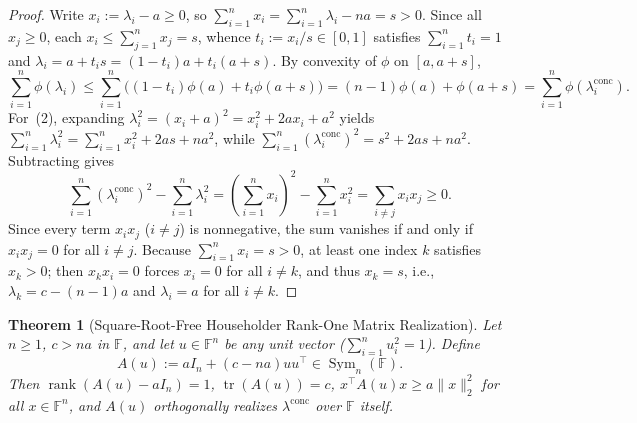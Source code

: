 \documentclass[11pt]{article}
\newtheorem{theorem}{Theorem}[section]
\theoremstyle{definition}
\theoremstyle{remark}
\newcommand{\tr}{\operatorname{tr}}
\newcommand{\rk}{\operatorname{rank}}
\newcommand{\Sym}{\operatorname{Sym}}
\begin{document}
\begin{proof}
Write $x_i := \lambda_i - a \ge 0$, so $\sum_{i=1}^n x_i = \sum_{i=1}^n \lambda_i - n a = s > 0$. Since all $x_j \ge 0$, each $x_i \le \sum_{j=1}^n x_j = s$, whence $t_i := x_i / s \in [0,1]$ satisfies $\sum_{i=1}^n t_i = 1$ and $\lambda_i = a + t_i s = (1 - t_i)a + t_i(a + s)$. By convexity of $\phi$ on $[a, a + s]$,
\[
  \sum_{i=1}^n \phi(\lambda_i)
  \le \sum_{i=1}^n \bigl((1 - t_i)\phi(a) + t_i \phi(a + s)\bigr)
  = (n - 1)\phi(a) + \phi(a + s)
  = \sum_{i=1}^n \phi(\lambda_i^{\mathrm{conc}}).
\]
For~(2), expanding $\lambda_i^2 = (x_i + a)^2 = x_i^2 + 2 a x_i + a^2$ yields $\sum_{i=1}^n \lambda_i^2 = \sum_{i=1}^n x_i^2 + 2 a s + n a^2$, while $\sum_{i=1}^n (\lambda_i^{\mathrm{conc}})^2 = s^2 + 2 a s + n a^2$. Subtracting gives
\[
  \sum_{i=1}^n (\lambda_i^{\mathrm{conc}})^2 - \sum_{i=1}^n \lambda_i^2
  = \left(\sum_{i=1}^n x_i\right)^2 - \sum_{i=1}^n x_i^2
  = \sum_{i \neq j} x_i x_j \ge 0.
\]
Since every term $x_i x_j$ ($i \neq j$) is nonnegative, the sum vanishes if and only if $x_i x_j = 0$ for all $i \neq j$. Because $\sum_{i=1}^n x_i = s > 0$, at least one index $k$ satisfies $x_k > 0$; then $x_k x_i = 0$ forces $x_i = 0$ for all $i \neq k$, and thus $x_k = s$, i.e., $\lambda_k = c - (n-1)a$ and $\lambda_i = a$ for all $i \neq k$.
\end{proof}

\begin{theorem}[Square-Root-Free Householder Rank-One Matrix Realization]
\label{thm:householder}
Let $n \ge 1$, $c > n a$ in $\mathbb{F}$, and let $u \in \mathbb{F}^n$ be any unit vector ($\sum_{i=1}^n u_i^2 = 1$). Define
\[
  A(u) := a I_n + (c - n a) u u^\top \in \Sym_n(\mathbb{F}).
\]
Then $\rk(A(u) - a I_n) = 1$, $\tr(A(u)) = c$, $x^\top A(u) x \ge a \|x\|_2^2$ for all $x \in \mathbb{F}^n$, and $A(u)$ orthogonally realizes $\lambda^{\mathrm{conc}}$ over $\mathbb{F}$ itself.
\end{theorem}
\end{document}
